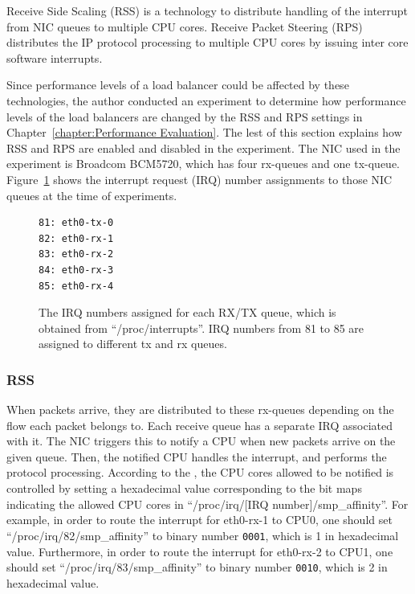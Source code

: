 Receive Side Scaling (RSS) \cite{TomHerbert} is a technology 
to distribute handling of the interrupt from NIC queues to multiple CPU cores.
Receive Packet Steering (RPS) \cite{TomHerbert} distributes the IP protocol processing 
to multiple CPU cores by issuing inter core software interrupts.

Since performance levels of a load balancer could be affected by these technologies,
the author conducted an experiment to determine how performance levels of the load balancers are changed by the RSS and RPS settings in Chapter~\ref{chapter:Performance Evaluation}.
The lest of this section explains how RSS and RPS are enabled and disabled in the experiment.
The NIC used in the experiment is Broadcom BCM5720, which has four rx-queues and one tx-queue.
Figure~\ref{fig:rx-queue} shows the interrupt request (IRQ) number assignments to those NIC queues at the time of experiments.

\begin{figure}[h]
\centering
\begin{minipage}{0.3\columnwidth}
\begin{verbatim}
81: eth0-tx-0
82: eth0-rx-1
83: eth0-rx-2
84: eth0-rx-3
85: eth0-rx-4
\end{verbatim}
\end{minipage}

\par\bigskip
\centering
\begin{minipage}{0.9\columnwidth}
  \caption[The IRQ numbers assigned for each RX/TX queue]{
    The IRQ numbers assigned for each RX/TX queue, which is obtained from \enquote{/proc/interrupts}.
    IRQ numbers from 81 to 85 are assigned to different tx and rx queues.
  }
  \label{fig:rx-queue}
\end{minipage}

\end{figure}

\subsubsection{RSS}

When packets arrive, they are distributed to these rx-queues depending on the flow each packet belongs to.
Each receive queue has a separate IRQ associated with it. The NIC triggers
this to notify a CPU when new packets arrive on the given queue.
Then, the notified CPU handles the interrupt, and performs the protocol processing. 
According to the \cite{TomHerbert}, the CPU cores allowed to be notified is controlled by setting a hexadecimal value corresponding to the bit maps indicating the allowed CPU cores in \enquote{/proc/irq/[IRQ number]/smp\_affinity}.
%
For example, in order to route the interrupt for eth0-rx-1 to CPU0, one should set \enquote{/proc/irq/82/smp\_affinity} to binary number {\tt 0001}, which is 1 in hexadecimal value.
Furthermore, in order to route the interrupt for eth0-rx-2 to CPU1, one should set \enquote{/proc/irq/83/smp\_affinity} to binary number {\tt 0010}, which is 2 in hexadecimal value.

